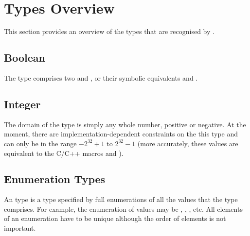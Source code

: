 
\section{Types Overview}
\label{Types}

This section provides an overview of the types that are recognised by
\nusmv.

\subsection{Boolean}
\label{Boolean Type}

The \Boolean type comprises two   and
, or their symbolic equivalents  and
.

\subsection{Integer}
\label{Integer Type}

%

The domain of the \Integer type is simply any whole number, positive
or negative.
%
At the moment, there are implementation-dependent constraints on the
this type and  can only be in the range
$-2^{32}+1$ to $2^{32}-1$ (more accurately, these values are
equivalent to the C/C++ macros  and ).

\subsection{Enumeration Types}
\label{Enumeration Types}

An \Enum type is a type specified by full enumerations of all the values
that the type comprises.  For example, the enumeration of values may be
, , , etc.  All elements of an enumeration have
to be unique although the order of elements is not important.


